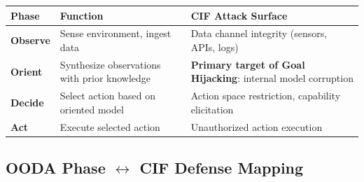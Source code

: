 \documentclass[
]{article}
\newcounter{none} %
\begin{document}
{\def\LTcaptype{none} %
\begin{longtable}[]{@{}
  >{\raggedright\arraybackslash}p{}
  >{\raggedright\arraybackslash}p{}
  >{\raggedright\arraybackslash}p{}@{}}
\toprule\noalign{}
\begin{minipage}[b]{\linewidth}\raggedright
Phase
\end{minipage} & \begin{minipage}[b]{\linewidth}\raggedright
Function
\end{minipage} & \begin{minipage}[b]{\linewidth}\raggedright
CIF Attack Surface
\end{minipage} \\
\midrule\noalign{}
\endhead
\bottomrule\noalign{}
\endlastfoot
\textbf{Observe} & Sense environment, ingest data & Data channel
integrity (sensors, APIs, logs) \\
\textbf{Orient} & Synthesize observations with prior knowledge &
\textbf{Primary target of Goal Hijacking}: internal model corruption \\
\textbf{Decide} & Select action based on oriented model & Action space
restriction, capability elicitation \\
\textbf{Act} & Execute selected action & Unauthorized action
execution \\
\end{longtable}
}

\subsection{\texorpdfstring{OODA Phase \(\leftrightarrow\) CIF Defense
Mapping}{OODA Phase \textbackslash leftrightarrow CIF Defense Mapping}}\label{ooda-phase-leftrightarrow-cif-defense-mapping}
\end{document}
